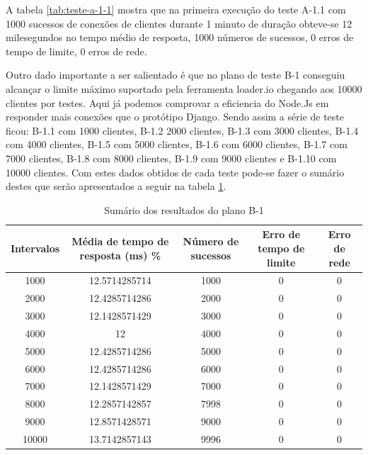   A tabela \ref{tab:teste-a-1-1} mostra que na primeira execução do teste A-1.1 com 1000 sucessos de conexões de clientes
  durante 1 minuto de duração obteve-se 12 milesegundos no tempo médio de resposta,
  1000 números de sucessos, 0 erros de tempo de limite, 0 erros de rede.
  
  Outro dado importante a ser salientado é que no plano de teste B-1 conseguiu alcançar o limite máximo suportado pela ferramenta
  loader.io chegando aos 10000 clientes por testes. Aqui já podemos comprovar a eficiencia do Node.Js em responder mais conexões que
  o protótipo Django. Sendo assim a série de teste ficou: B-1.1 com 1000 clientes, B-1.2 2000 clientes, 
  B-1.3 com 3000 clientes, B-1.4 com 4000 clientes, B-1.5 com 5000 clientes, B-1.6 com 6000 clientes, B-1.7 com 7000 clientes,
  B-1.8 com 8000 clientes, B-1.9 com 9000 clientes e B-1.10 com 10000 clientes. Com estes dados obtidos de cada teste pode-se fazer 
  o sumário destes que serão apresentados a seguir na tabela \ref{tab:sumario-resultado-plano-teste-b-1}.
  
  \begin{table}[H]
    \centering
    \footnotesize
    \setlength{\abovecaptionskip}{0pt}
    \setlength{\belowcaptionskip}{0pt}
    \caption[Sumário dos resultados do plano B-1]{Sumário dos resultados do plano B-1}
    \label{tab:sumario-resultado-plano-teste-b-1}
    \begin{tabular}{c|c|c|c|c}
      \hline \hline
      Intervalos  & 	Média de tempo de resposta (ms) \% &	Número de sucessos & 	Erro de tempo de limite &	Erro de rede \\ 
      \hline \hline
      1000 &		12.5714285714 &	 				1000 & 	 		0 &				0 \\
      2000 &		12.4285714286 &					2000 & 	 		0 &				0 \\
      3000 &		12.1428571429 &					3000 & 	 		0 &				0 \\
      4000 &		12  &						4000 & 	 		0 &				0 \\
      5000 &		12.4285714286  &				5000 & 	 		0 &				0 \\
      6000 &		12.4285714286 &					6000 & 	 		0 &				0 \\
      7000 &		12.1428571429 &					7000 & 	 		0 &				0 \\
      8000 &		12.2857142857 &					7998 & 	 		0 &				0 \\
      9000 &		12.8571428571 &					9000 & 	 		0 &				0 \\
      10000 &		13.7142857143 &					9996 & 	 		0 &				0 \\
      \hline \hline
    \end{tabular}
  \end{table}
   
